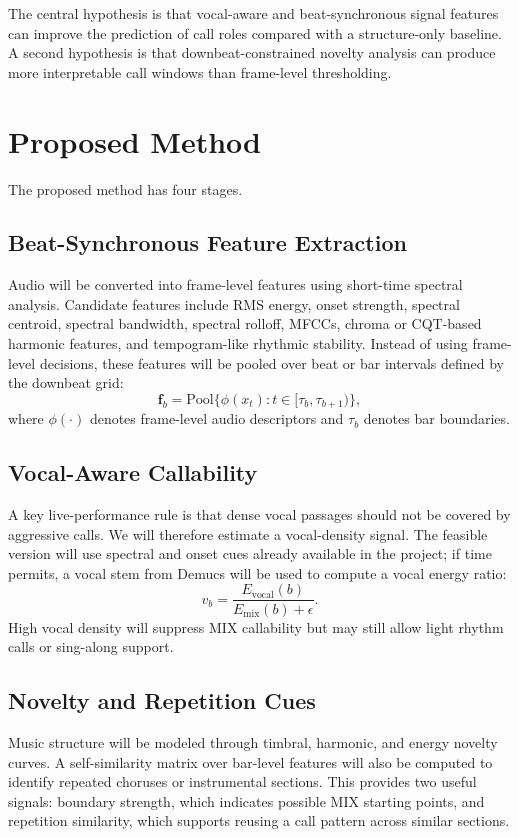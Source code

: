 \documentclass[lettersize,journal]{IEEEtran}
\begin{document}
The central hypothesis is that vocal-aware and beat-synchronous signal features can improve the prediction of call roles compared with a structure-only baseline. A second hypothesis is that downbeat-constrained novelty analysis can produce more interpretable call windows than frame-level thresholding.

\section{Proposed Method}
The proposed method has four stages.

\subsection{Beat-Synchronous Feature Extraction}
Audio will be converted into frame-level features using short-time spectral analysis. Candidate features include RMS energy, onset strength, spectral centroid, spectral bandwidth, spectral rolloff, MFCCs, chroma or CQT-based harmonic features, and tempogram-like rhythmic stability. Instead of using frame-level decisions, these features will be pooled over beat or bar intervals defined by the downbeat grid:
\begin{equation}
\mathbf{f}_b =
\mathrm{Pool}\{\phi(x_t): t \in [\tau_b,\tau_{b+1})\},
\end{equation}
where $\phi(\cdot)$ denotes frame-level audio descriptors and $\tau_b$ denotes bar boundaries.

\subsection{Vocal-Aware Callability}
A key live-performance rule is that dense vocal passages should not be covered by aggressive calls. We will therefore estimate a vocal-density signal. The feasible version will use spectral and onset cues already available in the project; if time permits, a vocal stem from Demucs will be used to compute a vocal energy ratio:
\begin{equation}
v_b =
\frac{E_{\mathrm{vocal}}(b)}
{E_{\mathrm{mix}}(b)+\epsilon}.
\end{equation}
High vocal density will suppress MIX callability but may still allow light rhythm calls or sing-along support.

\subsection{Novelty and Repetition Cues}
Music structure will be modeled through timbral, harmonic, and energy novelty curves. A self-similarity matrix over bar-level features will also be computed to identify repeated choruses or instrumental sections. This provides two useful signals: boundary strength, which indicates possible MIX starting points, and repetition similarity, which supports reusing a call pattern across similar sections.
\end{document}
